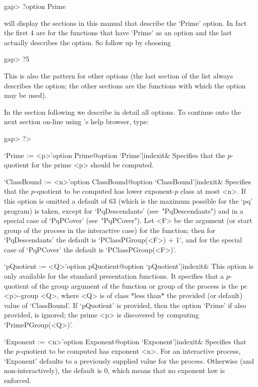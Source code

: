 \begintt
gap> ?option Prime
\endtt

will display the sections  in  this  manual  that  describe  the  `Prime'
option. In fact the first 4 are for the functions that have `Prime' as an
option and the last actually  describes  the  option.  So  follow  up  by
choosing

\begintt
gap> ?5
\endtt

This is also the pattern for other options (the last section of the  list
always describes the option; the other sections are  the  functions  with
which the option may be used).

In the section following we describe in detail all {\ANUPQ}  options.  To
continue onto the next section on-line using {\GAP}'s help browser, type:

\begintt
gap> ?>
\endtt


\beginitems

\>`Prime := <p>'{option Prime}@{option `Prime'|indexit}&
Specifies that the $p$-quotient for the prime  <p>  should  be  computed.

\>`ClassBound := <n>'{option  ClassBound}@{option  `ClassBound'|indexit}&
Specifies that the $p$-quotient to be  computed  has  lower  exponent-$p$
class at most <n>. If this option is omitted a default of  63  (which  is
the  maximum  possible  for  the  `pq'  program)  is  taken,  except  for
`PqDescendants' (see~"PqDescendants") and in a special case of `PqPCover'
(see~"PqPCover"). Let <F> be the argument (or start group of the  process
in the interactive case) for the function; then for  `PqDescendants'  the
default  is  `PClassPGroup(<F>)  +  1',  and  for  the  special  case  of
`PqPCover' the default is `PClassPGroup(<F>)'.

\>`pQuotient := <Q>'{option pQuotient}@{option `pQuotient'|indexit}&
This option is only available for the standard presentation functions. It
specifies that a $p$-quotient of the group argument of  the  function  or
group of the process is the pc <p>-group  <Q>,  where  <Q>  is  of  class
*less  than*  the  provided  (or  default)  value  of  `ClassBound'.   If
`pQuotient' is provided, then the option  `Prime'  if  also  provided, is
ignored; the prime <p> is discovered by computing `PrimePGroup(<Q>)'.

\>`Exponent := <n>'{option Exponent}@{option `Exponent'|indexit}&
Specifies that the $p$-quotient to be computed has exponent <n>.  For  an
interactive process, `Exponent' defaults to a previously  supplied  value
for the process. Otherwise (and non-interactively),  the  default  is  0,
which means that no exponent law is enforced.

